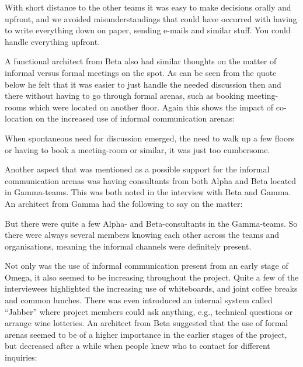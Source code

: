\begin{fancyquotes}
With short distance to the other teams it was easy to make decisions orally and upfront, and we avoided misunderstandings that could have occurred with having to write everything down on paper, sending e-mails and similar stuff. You could handle everything upfront.
\end{fancyquotes}

A functional architect from Beta also had similar thoughts on the matter of informal versus formal meetings on the spot. As can be seen from the quote below he felt that it was easier to just handle the needed discussion then and there without having to go through formal arenas, such as booking meeting-rooms which were located on another floor. Again this shows the impact of co-location on the increased use of informal communication arenas:

\begin{fancyquotes}
When spontaneous need for discussion emerged, the need to walk up a few floors or having to book a meeting-room or similar, it was just too cumbersome.
\end{fancyquotes}

Another aspect that was mentioned as a possible support for the informal communication arenas was having consultants from both Alpha and Beta located in Gamma-teams. This was both noted in the interview with Beta and Gamma. An architect from Gamma had the following to say on the matter:

\begin{fancyquotes}
But there were quite a few Alpha- and Beta-consultants in the Gamma-teams. So there were always several members knowing each other across the teams and organisations, meaning the informal channels were definitely present.
\end{fancyquotes}

Not only was the use of informal communication present from an early stage of Omega, it also seemed to be increasing throughout the project. Quite a few of the interviewees highlighted the increasing use of whiteboards, and joint coffee breaks and common lunches. There was even introduced an internal system called ``Jabber'' where project members could ask anything, e.g., technical questions or arrange wine lotteries. An architect from Beta suggested that the use of formal arenas seemed to be of a higher importance in the earlier stages of the project, but decreased after a while when people knew who to contact for different inquiries:

